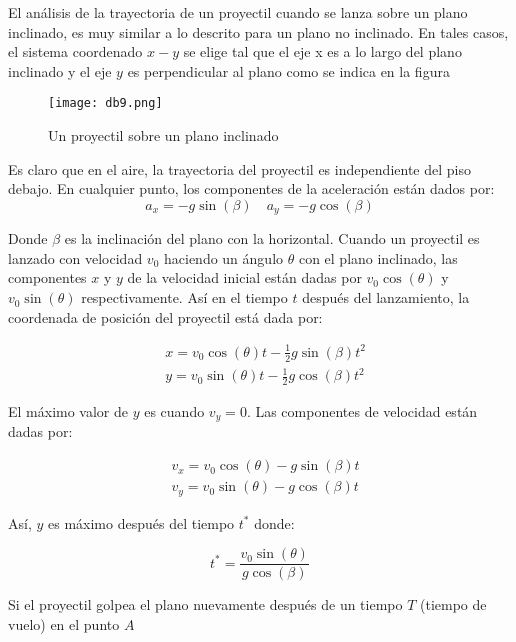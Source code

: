 \begin{example}
    El análisis de la trayectoria de un proyectil cuando se lanza sobre un plano inclinado, es muy similar a lo descrito para un plano no inclinado. En tales casos, el sistema coordenado $x-y$ se elige tal que el eje x es a lo largo del plano inclinado y el eje $y$ es perpendicular al plano como se indica en la figura
\end{example}

\begin{figure}[h!]
  \centerline{\texttt{[image: db9.png]}}
  \caption{Un proyectil sobre un plano inclinado}
  \label{db9}
\end{figure}

Es claro que en el aire, la trayectoria del proyectil es independiente del piso debajo. En cualquier punto, los componentes de la aceleración están dados por: 
\begin{equation}
    a_x=-g\sin{(\beta)}\quad a_y=-g\cos{(\beta)}
\end{equation}

Donde $\beta$ es la inclinación del plano con la horizontal. Cuando un proyectil es lanzado con velocidad $v_0$ haciendo un ángulo $\theta$ con el plano inclinado, las componentes $x$ y $y$ de la velocidad inicial están dadas por $v_0\cos{(\theta)}$ y $v_0\sin{(\theta)}$ respectivamente. Así en el tiempo $t$ después del lanzamiento, la coordenada de posición del proyectil está dada por: 

\begin{align}
    &x=v_0\cos{(\theta)}t-\frac{1}{2}g\sin{(\beta)}t^2\\
    &y=v_0\sin{(\theta)}t-\frac{1}{2}g\cos{(\beta)}t^2
\end{align}

El máximo valor de $y$ es cuando $v_y=0$. Las componentes de velocidad están dadas por:

\begin{align}
    &v_x=v_0\cos{(\theta)}-g\sin{(\beta)}t\\
    &v_y=v_0\sin{(\theta)}-g\cos{(\beta)}t
\end{align}

Así, $y$ es máximo después del tiempo $t^{*}$ donde: 

\begin{equation}
    t^*=\frac{v_0\sin{(\theta)}}{g\cos{(\beta)}}
\end{equation}

Si el proyectil golpea el plano nuevamente después de un tiempo $T$ (tiempo de vuelo) en el punto  $A$

